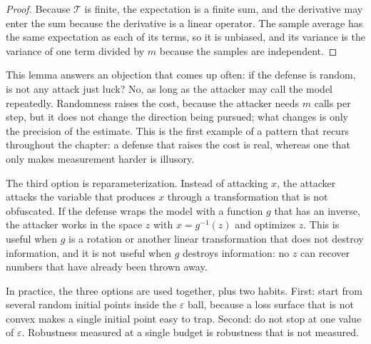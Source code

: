 \begin{proof}
Because $\mathcal{T}$ is finite, the expectation is a finite sum, and the derivative may
enter the sum because the derivative is a linear operator. The sample average has the
same expectation as each of its terms, so it is unbiased, and its variance is the variance
of one term divided by $m$ because the samples are independent.
\end{proof}

This lemma answers an objection that comes up often: if the defense is random, is not any
attack just luck? No, as long as the attacker may call the model
repeatedly. Randomness raises the cost, because the attacker needs $m$ calls per step,
but it does not change the direction being pursued; what changes is only the precision of the
estimate. This is the first example of a pattern that recurs throughout the chapter: a defense that
raises the cost is real, whereas one that only makes measurement harder is illusory.

The third option is reparameterization. Instead of attacking $x$, the attacker attacks
the variable that produces $x$ through a transformation that is not obfuscated. If
the defense wraps the model with a function $g$ that has an inverse, the attacker works in the
space $z$ with $x=g^{-1}(z)$ and optimizes $z$. This is useful when $g$ is a
rotation or another linear transformation that does not destroy information, and it is not
useful when $g$ destroys information: no $z$ can recover numbers
that have already been thrown away.

In practice, the three options are used together, plus two habits. First: start
from several random initial points inside the $\varepsilon$ ball, because a loss surface that
is not convex makes a single initial point easy to trap. Second: do not stop at one
value of $\varepsilon$. Robustness measured at a single budget is robustness that is not
measured.


